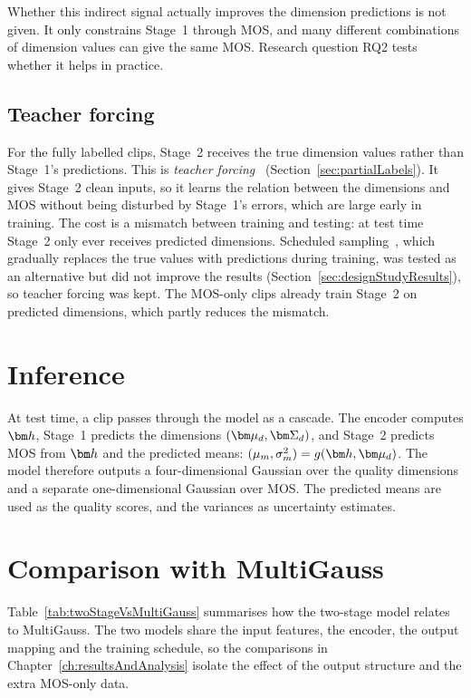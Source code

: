 \documentclass[
english,                 %
bibtex,                  %
includeExtraAbstracts, %
]{kththesis}
\numberwithin{listing}{chapter}
\begin{document}
Whether this indirect signal actually improves the dimension predictions is not given. It only constrains Stage~1 through MOS, and many different combinations of dimension values can give the same MOS. Research question RQ2 tests whether it helps in practice.

\subsection{Teacher forcing}

For the fully labelled clips, Stage~2 receives the true dimension values rather than Stage~1's predictions. This is \emph{teacher forcing}~\cite{williams_zipser_1989} (Section~\ref{sec:partialLabels}). It gives Stage~2 clean inputs, so it learns the relation between the dimensions and MOS without being disturbed by Stage~1's errors, which are large early in training. The cost is a mismatch between training and testing: at test time Stage~2 only ever receives predicted dimensions. Scheduled sampling~\cite{bengio_scheduled_2015}, which gradually replaces the true values with predictions during training, was tested as an alternative but did not improve the results (Section~\ref{sec:designStudyResults}), so teacher forcing was kept. The MOS-only clips already train Stage~2 on predicted dimensions, which partly reduces the mismatch.

\section{Inference}
\label{sec:inference}

At test time, a clip passes through the model as a cascade. The encoder computes $\vect{h}$, Stage~1 predicts the dimensions $(\vect{\mu}_d, \vect{\Sigma}_d)$, and Stage~2 predicts MOS from $\vect{h}$ and the predicted means: $(\mu_m, \sigma_m^2) = g(\vect{h}, \vect{\mu}_d)$. The model therefore outputs a four-dimensional Gaussian over the quality dimensions and a separate one-dimensional Gaussian over MOS. The predicted means are used as the quality scores, and the variances as uncertainty estimates.

\section{Comparison with MultiGauss}
\label{sec:comparisonMultiGauss}

Table~\ref{tab:twoStageVsMultiGauss} summarises how the two-stage model relates to MultiGauss. The two models share the input features, the encoder, the output mapping and the training schedule, so the comparisons in Chapter~\ref{ch:resultsAndAnalysis} isolate the effect of the output structure and the extra MOS-only data.
\end{document}
